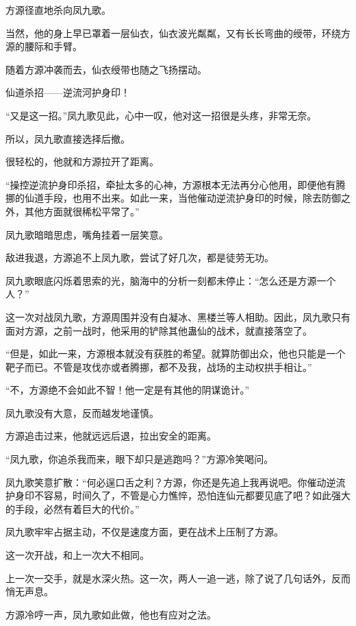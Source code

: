 
\begin{this_body}

方源径直地杀向凤九歌。

当然，他的身上早已罩着一层仙衣，仙衣波光粼粼，又有长长弯曲的绶带，环绕方源的腰际和手臂。

随着方源冲袭而去，仙衣绶带也随之飞扬摆动。

仙道杀招——逆流河护身印！

“又是这一招。”凤九歌见此，心中一叹，他对这一招很是头疼，非常无奈。

所以，凤九歌直接选择后撤。

很轻松的，他就和方源拉开了距离。

“操控逆流护身印杀招，牵扯太多的心神，方源根本无法再分心他用，即便他有腾挪的仙道手段，也用不出来。如此一来，当他催动逆流护身印的时候，除去防御之外，其他方面就很稀松平常了。”

凤九歌暗暗思虑，嘴角挂着一层笑意。

敌进我退，方源追不上凤九歌，尝试了好几次，都是徒劳无功。

凤九歌眼底闪烁着思索的光，脑海中的分析一刻都未停止：“怎么还是方源一个人？”

这一次对战凤九歌，方源周围并没有白凝冰、黑楼兰等人相助。因此，凤九歌只有面对方源，之前一战时，他采用的铲除其他蛊仙的战术，就直接落空了。

“但是，如此一来，方源根本就没有获胜的希望。就算防御出众，他也只能是一个靶子而已。不管是攻伐亦或者腾挪，都不及我，战场的主动权拱手相让。”

“不，方源绝不会如此不智！他一定是有其他的阴谋诡计。”

凤九歌没有大意，反而越发地谨慎。

方源追击过来，他就远远后退，拉出安全的距离。

“凤九歌，你追杀我而来，眼下却只是逃跑吗？”方源冷笑喝问。

凤九歌笑意扩散：“何必逞口舌之利？方源，你还是先追上我再说吧。你催动逆流护身印不容易，时间久了，不管是心力憔悴，恐怕连仙元都要见底了吧？如此强大的手段，必然有着巨大的代价。”

凤九歌牢牢占据主动，不仅是速度方面，更在战术上压制了方源。

这一次开战，和上一次大不相同。

上一次一交手，就是水深火热。这一次，两人一追一逃，除了说了几句话外，反而悄无声息。

方源冷哼一声，凤九歌如此做，他也有应对之法。


\end{this_body}
